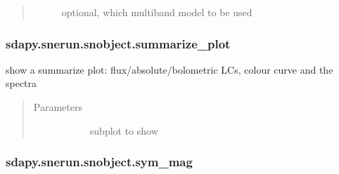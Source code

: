 \documentclass[letterpaper,10pt,english]{sphinxmanual}
\begin{document}
\begin{fulllineitems}
\begin{fulllineitems}
\begin{quote}
\begin{description}
\begin{description}
\item[{}] \leavevmode{[}\sphinxtitleref{str}{]}
optional, which multiband model to be used

\end{description}

\end{description}\end{quote}

\end{fulllineitems}



\subsubsection{sdapy.snerun.snobject.summarize\_plot}
\label{\detokenize{generated/sdapy.snerun.snobject.summarize_plot:sdapy-snerun-snobject-summarize-plot}}\label{\detokenize{generated/sdapy.snerun.snobject.summarize_plot::doc}}

\begin{fulllineitems}
\label{\detokenize{generated/sdapy.snerun.snobject.summarize_plot:sdapy.snerun.snobject.summarize_plot}}
show a summarize plot: flux/absolute/bolometric LCs, colour curve and the spectra
\begin{quote}\begin{description}
\item[{Parameters}] \leavevmode\begin{description}
\item[{}] \leavevmode{[}\sphinxtitleref{matplotlib.subplot}{]}
subplot to show

\end{description}

\end{description}\end{quote}

\end{fulllineitems}



\subsubsection{sdapy.snerun.snobject.sym\_mag}
\label{\detokenize{generated/sdapy.snerun.snobject.sym_mag:sdapy-snerun-snobject-sym-mag}}\label{\detokenize{generated/sdapy.snerun.snobject.sym_mag::doc}}


\end{fulllineitems}
\end{document}
